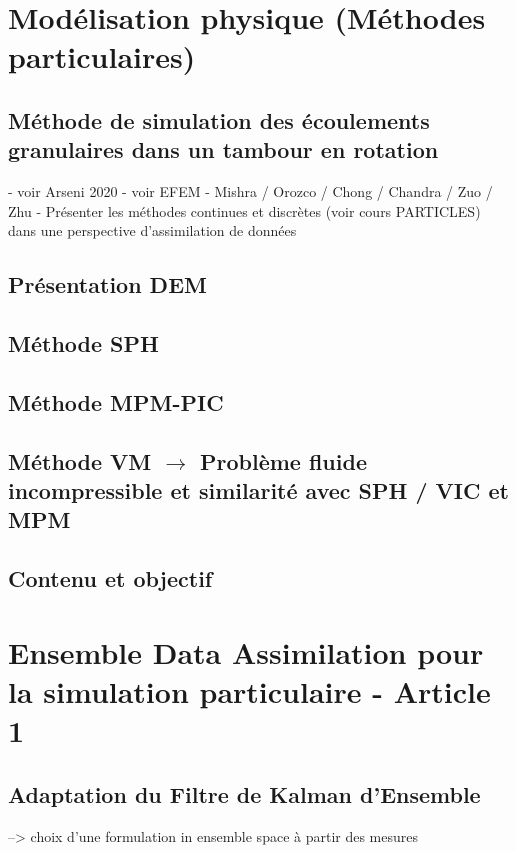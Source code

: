 \documentclass{article}
\begin{document}
\section{Modélisation physique (Méthodes particulaires)}

\subsection{Méthode de simulation des écoulements granulaires dans un tambour en rotation}

- voir Arseni 2020
- voir EFEM
- Mishra / Orozco / Chong / Chandra / Zuo / Zhu
- Présenter les méthodes continues et discrètes (voir cours PARTICLES) dans une perspective d'assimilation de données

\subsection{Présentation DEM}

\subsection{Méthode SPH}
\subsection{Méthode MPM-PIC}
\subsection{Méthode VM $\rightarrow$ Problème fluide incompressible et similarité avec SPH / VIC et MPM}

\subsection{Contenu et objectif}

\section{Ensemble Data Assimilation pour la simulation particulaire - Article 1}

\subsection{Adaptation du Filtre de Kalman d'Ensemble}
--> choix d'une formulation in ensemble space à partir des mesures
\end{document}
